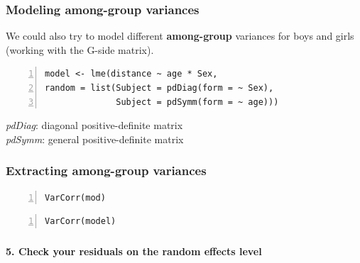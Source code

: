 \documentclass{beamer}
\begin{document}
\begin{frame}[fragile]
    \frametitle{Modeling among-group variances}
    We could also try to model different \textbf{among-group} variances for boys and girls (working with the G-side matrix).
    \vspace{0.5cm}

    \scriptsize
    \begin{Verbatim}[numbers=left,numbersep=6pt,frame=single]
model <- lme(distance ~ age * Sex,
random = list(Subject = pdDiag(form = ~ Sex),
              Subject = pdSymm(form = ~ age)))
    \end{Verbatim}
    \vspace{0.5cm}

    \normalsize
    \textit{pdDiag}: diagonal positive-definite matrix \\
    \textit{pdSymm}: general positive-definite matrix
\end{frame}

\begin{frame}[fragile]
    \frametitle{Extracting among-group variances}
    \scriptsize
    \begin{Verbatim}[numbers=left,numbersep=6pt,frame=single]
VarCorr(mod)
    \end{Verbatim}
    \scalebox{1}{
        
    }
    \begin{Verbatim}[numbers=left,numbersep=6pt,frame=single]
VarCorr(model)
    \end{Verbatim}
    \scalebox{1}{
        
    }
\end{frame}



\begin{frame}[fragile]
    \frametitle{}
    \huge\color{purple}\textbf{5. Check your residuals on the random effects level}
    \vspace{0.5cm}
    
    \normalsize\color{black}\textbf{}
\end{frame}
\end{document}
